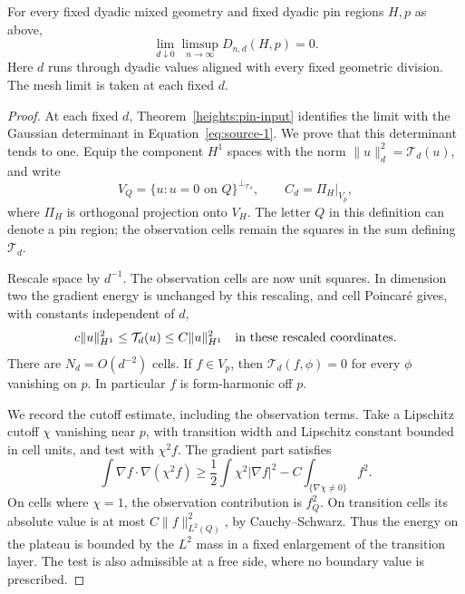 \begin{lemma}
\label{sectors:localization}
For every fixed dyadic mixed geometry and fixed dyadic pin regions
\(H,p\) as above,
\begin{equation}
 \lim_{d\downarrow0}\limsup_{n\to\infty}D_{n,d}(H,p)=0 .
 \tag{4}\label{eq:source-4}
\end{equation}
Here \(d\) runs through dyadic values aligned with every fixed
geometric division. The mesh limit is taken at each fixed \(d\).
\end{lemma}

\begin{proof}
At each fixed \(d\), Theorem~\ref{heights:pin-input} identifies the
limit with the Gaussian determinant in Equation~\eqref{eq:source-1}.
We prove that this determinant tends to one.
Equip the component \(H^1\) spaces with the norm
\(\|u\|_d^2=\mathcal T_d(u)\), and write
\[
 V_Q=\{u:u=0\text{ on }Q\}^{\perp_{\mathcal T_d}},\qquad
 C_d=\Pi_H|_{V_p},
\]
where \(\Pi_H\) is orthogonal projection onto \(V_H\).
The letter \(Q\) in this definition can denote a pin region;
the observation cells remain the squares in the sum defining
\(\mathcal T_d\).

Rescale space by \(d^{-1}\). The observation cells are now unit
squares. In dimension two the gradient energy is unchanged by this
rescaling, and cell Poincar\'e gives, with constants independent of \(d\),
\begin{equation}
 c\|u\|_{H^1}^2\le \mathcal T_d(u)\le C\|u\|_{H^1}^2
 \quad\hbox{in these rescaled coordinates}.
 \label{sectors:cell-coercivity}
\end{equation}
There are \(N_d=O(d^{-2})\) cells.
If \(f\in V_p\), then
\(\mathcal T_d(f,\phi)=0\) for every \(\phi\) vanishing on \(p\).
In particular \(f\) is form-harmonic off \(p\).

We record the cutoff estimate, including the observation terms.
Take a Lipschitz cutoff \(\chi\) vanishing near \(p\), with transition
width and Lipschitz constant bounded in cell units, and test with
\(\chi^2f\). The gradient part satisfies
\[
 \int\nabla f\cdot\nabla(\chi^2f)
 \ge \frac12\int\chi^2|\nabla f|^2
      -C\int_{\{\nabla\chi\ne0\}}f^2.
\]
On cells where \(\chi=1\), the observation contribution is \(f_Q^2\).
On transition cells its absolute value is at most
\(C\|f\|_{L^2(Q)}^2\), by Cauchy--Schwarz.
Thus the energy on the plateau is bounded by the \(L^2\) mass in
a fixed enlargement of the transition layer. The test is also
admissible at a free side, where no boundary value is prescribed.


\end{proof}
